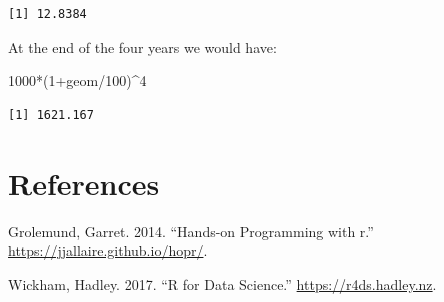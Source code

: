 \documentclass[
  letterpaper,
  DIV=11,
  numbers=noendperiod]{scrreprt}
\newenvironment{Shaded}{\begin{snugshade}}{\end{snugshade}}
\newcommand{\DecValTok}[1]{\textcolor[rgb]{0.68,0.00,0.00}{#1}}
\newcommand{\NormalTok}[1]{\textcolor[rgb]{0.00,0.23,0.31}{#1}}
\newcommand{\SpecialCharTok}[1]{\textcolor[rgb]{0.37,0.37,0.37}{#1}}
\newlength{\cslhangindent}
\newlength{\cslentryspacingunit} %
\newenvironment{CSLReferences}[2] %
 {%
  \setlength{\parindent}{0pt}
  \ifodd #1
  \let\oldpar\par
  \def\par{\hangindent=\cslhangindent\oldpar}
  \fi
  \setlength{\parskip}{#2\cslentryspacingunit}
 }%
 {}
\begin{document}
\begin{verbatim}
[1] 12.8384
\end{verbatim}

At the end of the four years we would have:

\begin{Shaded}
\begin{Highlighting}[numbers=left,,]
\DecValTok{1000}\SpecialCharTok{*}\NormalTok{(}\DecValTok{1}\SpecialCharTok{+}\NormalTok{geom}\SpecialCharTok{/}\DecValTok{100}\NormalTok{)}\SpecialCharTok{\^{}}\DecValTok{4}
\end{Highlighting}
\end{Shaded}

\begin{verbatim}
[1] 1621.167
\end{verbatim}


\hypertarget{references}{%
\chapter*{References}\label{references}}


\hypertarget{refs}{}
\begin{CSLReferences}{1}{0}
\leavevmode{}%
Grolemund, Garret. 2014. {``Hands-on Programming with r.''}
\url{https://jjallaire.github.io/hopr/}.

\leavevmode{}%
Wickham, Hadley. 2017. {``R for Data Science.''}
\url{https://r4ds.hadley.nz}.

\end{CSLReferences}



\printindex
\end{document}
